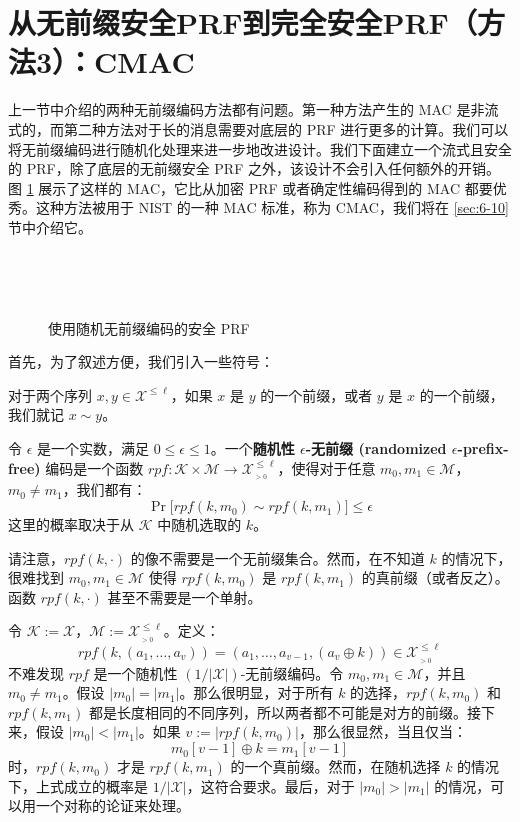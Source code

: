 \section{从无前缀安全PRF到完全安全PRF（方法3）：CMAC}\label{sec:6-7}

上一节中介绍的两种无前缀编码方法都有问题。第一种方法产生的 MAC 是非流式的，而第二种方法对于长的消息需要对底层的 PRF 进行更多的计算。我们可以将无前缀编码进行随机化处理来进一步地改进设计。我们下面建立一个流式且安全的 PRF，除了底层的无前缀安全 PRF 之外，该设计不会引入任何额外的开销。图 \ref{fig:6-6} 展示了这样的 MAC，它比从加密 PRF 或者确定性编码得到的 MAC 都要优秀。这种方法被用于 NIST 的一种 MAC 标准，称为 CMAC，我们将在 \ref{sec:6-10} 节中介绍它。

\begin{figure}
  \centering
  
  \,
  
  \,
  
  \caption{使用随机无前缀编码的安全 PRF}
  \label{fig:6-6}
\end{figure}

首先，为了叙述方便，我们引入一些符号：

\begin{definition}\label{def:6-5}
对于两个序列 $x,y\in\mathcal{X}^{\leq\ell}$，如果 $x$ 是 $y$ 的一个前缀，或者 $y$ 是 $x$ 的一个前缀，我们就记 $x\sim y$。
\end{definition}

\begin{definition}\label{def:6-6}
令 $\epsilon$ 是一个实数，满足 $0\leq\epsilon\leq1$。一个\textbf{随机性 $\epsilon$-无前缀 (randomized $\epsilon$-prefix-free)} 编码是一个函数 $rpf:\mathcal{K}\times\mathcal{M}\to\mathcal{X}^{\leq\ell}_{_{>0}}$，使得对于任意 $m_0,m_1\in\mathcal{M}$，$m_0\neq m_1$，我们都有：
\[
\Pr\big[rpf(k,m_0)\sim rpf(k,m_1)\big]\leq\epsilon
\]
这里的概率取决于从 $\mathcal{K}$ 中随机选取的 $k$。
\end{definition}

\noindent
请注意，$rpf(k,\cdot)$ 的像不需要是一个无前缀集合。然而，在不知道 $k$ 的情况下，很难找到 $m_0,m_1\in\mathcal{M}$ 使得 $rpf(k,m_0)$ 是 $rpf(k,m_1)$ 的真前缀（或者反之）。函数 $rpf(k,\cdot)$ 甚至不需要是一个单射。

\begin{snote}
令 $\mathcal{K}:=\mathcal{X}$，$\mathcal{M}:=\mathcal{X}^{\leq\ell}_{_{>0}}$。定义：
\[
rpf(k,(a_1,\dots,a_v))=(a_1,\dots,a_{v-1},(a_v\oplus k))\in\mathcal{X}^{\leq\ell}_{_{>0}}
\]
不难发现 $rpf$ 是一个随机性 $({1}/{|\mathcal{X}|})$-无前缀编码。令 $m_0,m_1\in\mathcal{M}$，并且 $m_0\neq m_1$。假设 $|m_0|=|m_1|$。那么很明显，对于所有 $k$ 的选择，$rpf(k,m_0)$ 和 $rpf(k,m_1)$ 都是长度相同的不同序列，所以两者都不可能是对方的前缀。接下来，假设 $|m_0|<|m_1|$。如果 $v:=|rpf(k,m_0)|$，那么很显然，当且仅当：
\[
m_0[v-1]\oplus k=m_1[v-1]
\]
时，$rpf(k,m_0)$ 才是 $rpf(k,m_1)$ 的一个真前缀。然而，在随机选择 $k$ 的情况下，上式成立的概率是 ${1}/{|\mathcal{X}|}$，这符合要求。最后，对于 $|m_0|>|m_1|$ 的情况，可以用一个对称的论证来处理。
\end{snote}

